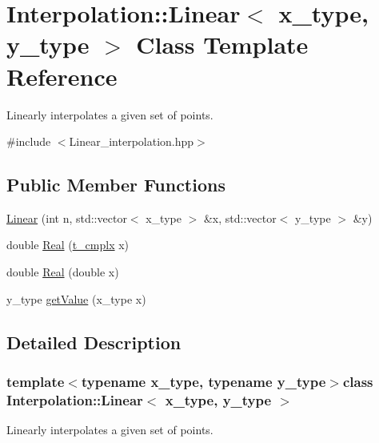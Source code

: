 \hypertarget{class_interpolation_1_1_linear}{\section{Interpolation\-:\-:Linear$<$ x\-\_\-type, y\-\_\-type $>$ Class Template Reference}
\label{class_interpolation_1_1_linear}
}


Linearly interpolates a given set of points.  




{\ttfamily \#include $<$Linear\-\_\-interpolation.\-hpp$>$}

\subsection*{Public Member Functions}
\begin{DoxyCompactItemize}
\item 
\hyperlink{class_interpolation_1_1_linear_a931383bc431497777e5e0f8c3b43dff3}{Linear} (int n, std\-::vector$<$ x\-\_\-type $>$ \&x, std\-::vector$<$ y\-\_\-type $>$ \&y)
\item 
double \hyperlink{class_interpolation_1_1_linear_a741729571890e0121a85834ca93bf52a}{Real} (\hyperlink{types_8h_aa75ae339052372f671bb263e6a272e82}{t\-\_\-cmplx} x)
\item 
double \hyperlink{class_interpolation_1_1_linear_a5ebf069101fb53752f9591c6b82c3a15}{Real} (double x)
\item 
y\-\_\-type \hyperlink{class_interpolation_1_1_linear_a0293e0e3e3ccff56c979ce054ea6c023}{get\-Value} (x\-\_\-type x)
\end{DoxyCompactItemize}


\subsection{Detailed Description}
\subsubsection*{template$<$typename x\-\_\-type, typename y\-\_\-type$>$class Interpolation\-::\-Linear$<$ x\-\_\-type, y\-\_\-type $>$}

Linearly interpolates a given set of points. 

